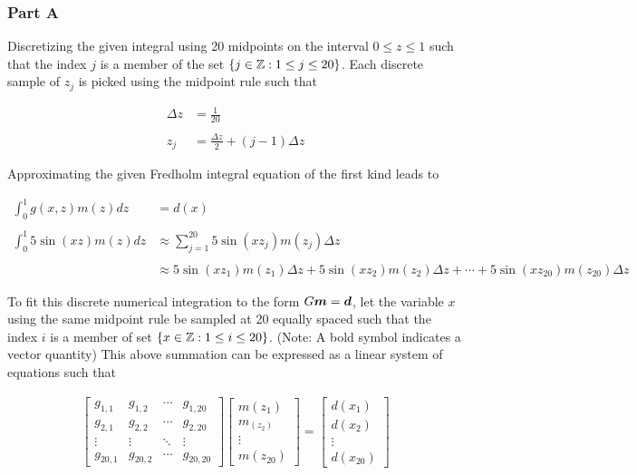 \subsubsection*{Part A}

 Discretizing the given integral using 20 midpoints on the interval $0 \leq z \leq 1$ such that the index $j$ is a member of the set $\{j \in \mathbb{Z} : 1 \leq j \leq 20\}$. Each discrete sample of $z_j$ is picked using the midpoint rule such that
 
 \begin{align*}
 	\Delta z &= \frac{1}{20} \\
 	\\
 	z_j &= \frac{\Delta z}{2} + \left(j - 1\right) \Delta z
 \end{align*}
 
 Approximating the given Fredholm integral equation of the first kind leads to

\begin{align*}
	\int_{0}^{1} g(x,z) m(z) dz &= d(x) \\
	\\
	\int_{0}^{1} 5 \sin(xz) m(z) dz &\approx \sum_{j = 1}^{20} 5 \sin(xz_{j}) m(z_{j}) \Delta z \\
	\\
	&\approx 5 \sin(xz_{1}) m(z_{1}) \Delta z + 5 \sin(xz_{2}) m(z_{2}) \Delta z + \cdots + 5 \sin(xz_{20}) m(z_{20}) \Delta z
\end{align*}

To fit this discrete numerical integration to the form $G\boldsymbol{m} = \boldsymbol{d}$, let the variable $x$ using the same midpoint rule be sampled at 20 equally spaced such that the index $i$ is a member of set $\{x \in \mathbb{Z} : 1 \leq i \leq 20\}$. (Note: A bold symbol indicates a vector quantity) This above summation can be expressed as a linear system of equations such that

\begin{align*}
	\begin{bmatrix}
		g_{1,1} & g_{1,2} & \cdots & g_{1,20} \\ 
		g_{2,1} & g_{2,2} & \cdots & g_{2,20} \\ 
		\vdots & \vdots & \ddots & \vdots \\
		g_{20,1} & g_{20,2} & \cdots & g_{20,20}
	\end{bmatrix}
	\begin{bmatrix}
		m(z_{1}) \\ m_(z_{2}) \\ \vdots \\ m(z_{20})
	\end{bmatrix}
	= \begin{bmatrix}
		d(x_{1}) \\ d(x_{2}) \\ \vdots \\ d(x_{20})
	\end{bmatrix}
\end{align*}

